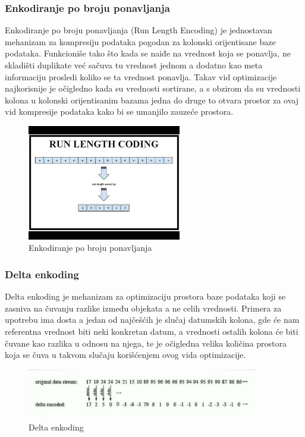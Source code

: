 \documentclass[12pt,oneside]{memoir}
\begin{document}
\subsubsection{Enkodiranje po broju ponavljanja}

Enkodiranje po broju ponavljanja (Run Length Encoding) je jednostavan mehanizam za kompresiju podataka pogodan za kolonski orijentisane baze podataka. Funkcioniše tako što kada se naiđe na vrednost koja se ponavlja, ne skladišti duplikate već sačuva tu vrednost jednom a dodatno kao meta informaciju prosledi koliko se ta vrednost ponavlja. Takav vid optimizacije najkorisnije je očigledno kada su vrednosti sortirane, a s obzirom da su vrednosti kolona u kolonski orijentisanim bazama jedna do druge to otvara prostor za ovaj vid kompresije podataka kako bi se umanjilo zauzeće prostora.

\begin{figure}[!ht]
  \centering
  \includegraphics[width=0.6\textwidth]{run-length-encoding.jpg}
  \caption{Enkodiranje po broju ponavljanja}
  \label{fig:grafikon}
\end{figure}

\subsubsection{Delta enkoding}
Delta enkoding je mehanizam za optimizaciju prostora baze podataka koji se zasniva na čuvanju razlike između objekata a ne celih vrednosti. Primera za upotrebu ima dosta a jedan od najčešćih je slučaj datumskih kolona, gde će nam referentna vrednost biti neki konkretan datum, a vrednosti ostalih kolona će biti čuvane kao razlika u odnosu na njega, te je očigledna velika količina prostora koja se čuva u takvom slučaju korišćenjem ovog vida optimizacije.

\begin{figure}[!ht]
  \centering
  \includegraphics[width=0.9\textwidth]{delta-encoding.png}
  \caption{Delta enkoding}
  \label{fig:grafikon}
\end{figure}
\end{document}
